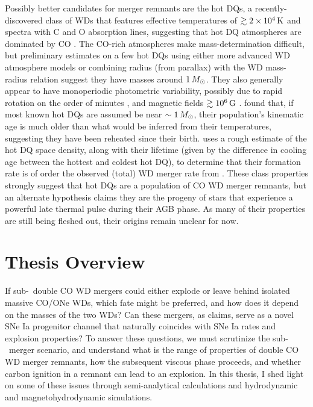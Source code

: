 Possibly better candidates for merger remnants are the hot DQs, a recently-discovered class of WDs that features effective temperatures of $\gtrsim2\times10^4\,\mathrm{K}$ and spectra with C and O absorption lines, suggesting that hot DQ atmospheres are dominated by CO \citep{dufo+07, dufo+08}.  The CO-rich atmospheres make mass-determination difficult, but preliminary estimates on a few hot DQs using either more advanced WD atmosphere models \citep{dufo+11} or combining radius (from parallax) with the WD mass-radius relation \citep{dunl15thesis} suggest they have masses around $1\,\Msun$.  They also generally appear to have monoperiodic photometric variability, possibly due to rapid rotation on the order of minutes \citep{lawr+13, will+16}, and magnetic fields $\gtrsim10^6\,\mathrm{G}$ \citep{dufo+13}.  \cite{dunlc15} found that, if most known hot DQs are assumed be near $\sim1\,\Msun$, their population's kinematic age is much older than what would be inferred from their temperatures, suggesting they have been reheated since their birth.  \cite{dunl15thesis} uses a rough estimate of the hot DQ space density, along with their lifetime (given by the difference in cooling age between the hottest and coldest hot DQ), to determine that their formation rate is of order the observed (total) WD merger rate from \cite{badem12}.  These class properties strongly suggest that hot DQs are a population of CO WD merger remnants, but an alternate hypothesis \citep{dufo+07, alth+09} claims they are the progeny of stars that experience a powerful late thermal pulse during their AGB phase.  As many of their properties are still being fleshed out, their origins remain unclear for now.

\section{Thesis Overview}

If sub-\Mch\ double CO WD mergers could either explode or leave behind isolated massive CO/ONe WDs, which fate might be preferred, and how does it depend on the masses of the two WDs?  Can these mergers, as \citeal{vkercj10} claims, serve as a novel SNe Ia progenitor channel that naturally coincides with SNe Ia rates and explosion properties?  To answer these questions, we must scrutinize the \citeal{vkercj10} sub-\Mch\ merger scenario, and understand what is the range of properties of double CO WD merger remnants, how the subsequent viscous phase proceeds, and whether carbon ignition in a remnant can lead to an explosion.  In this thesis, I shed light on some of these issues through semi-analytical calculations and hydrodynamic and magnetohydrodynamic simulations.

